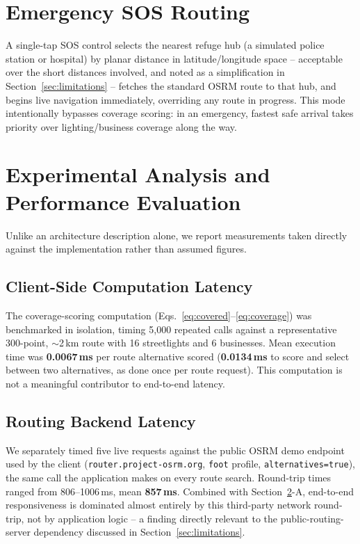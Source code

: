 \documentclass[conference]{IEEEtran}
\begin{document}
\section{Emergency SOS Routing}
\label{sec:sos}

A single-tap SOS control selects the nearest refuge hub (a simulated police station or hospital) by planar distance in latitude/longitude space -- acceptable over the short distances involved, and noted as a simplification in Section~\ref{sec:limitations} -- fetches the standard OSRM route to that hub, and begins live navigation immediately, overriding any route in progress. This mode intentionally bypasses coverage scoring: in an emergency, fastest safe arrival takes priority over lighting/business coverage along the way.

\section{Experimental Analysis and Performance Evaluation}
\label{sec:evaluation}

Unlike an architecture description alone, we report measurements taken directly against the implementation rather than assumed figures.

\subsection{Client-Side Computation Latency}
The coverage-scoring computation (Eqs.~\eqref{eq:covered}--\eqref{eq:coverage}) was benchmarked in isolation, timing 5{,}000 repeated calls against a representative 300-point, $\sim$2\,km route with 16 streetlights and 6 businesses. Mean execution time was \textbf{0.0067\,ms} per route alternative scored (\textbf{0.0134\,ms} to score and select between two alternatives, as done once per route request). This computation is not a meaningful contributor to end-to-end latency.

\subsection{Routing Backend Latency}
We separately timed five live requests against the public OSRM demo endpoint used by the client (\texttt{router.project-osrm.org}, \texttt{foot} profile, \texttt{alternatives=true}), the same call the application makes on every route search. Round-trip times ranged from 806--1006\,ms, mean \textbf{857\,ms}. Combined with Section~\ref{sec:evaluation}-A, end-to-end responsiveness is dominated almost entirely by this third-party network round-trip, not by application logic -- a finding directly relevant to the public-routing-server dependency discussed in Section~\ref{sec:limitations}.
\end{document}
